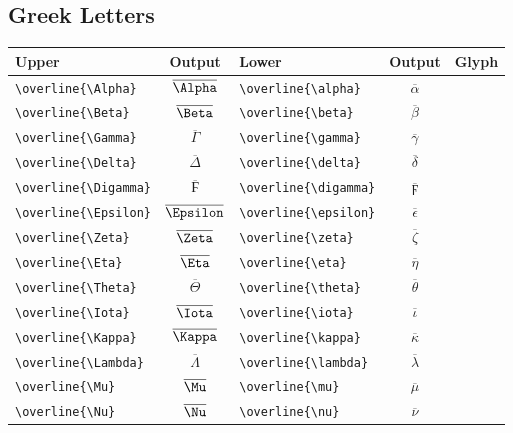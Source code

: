 \documentclass[12pt,a4paper]{article}
\begin{document}
\subsection*{Greek Letters}
\begin{longtable}{|l|c|l|c|c|}
\hline
\textbf{Upper} & \textbf{Output} & \textbf{Lower}        & \textbf{Output}               & \textbf{Glyph} \\
\hline
\verb|\overline{\Alpha}|         & $\overline{\Alpha}$   & \verb|\overline{\alpha}|      & $\overline{\alpha}$      & \\
\verb|\overline{\Beta}|          & $\overline{\Beta}$    & \verb|\overline{\beta}|       & $\overline{\beta}$       & \\
\verb|\overline{\Gamma}|         & $\overline{\Gamma}$   & \verb|\overline{\gamma}|      & $\overline{\gamma}$      & \\
\verb|\overline{\Delta}|         & $\overline{\Delta}$   & \verb|\overline{\delta}|      & $\overline{\delta}$      & \\
\verb|\overline{\Digamma}|       & $\overline{\Digamma}$ & \verb|\overline{\digamma}|    & $\overline{\digamma}$    & \\
\verb|\overline{\Epsilon}|       & $\overline{\Epsilon}$ & \verb|\overline{\epsilon}|    & $\overline{\epsilon}$    & \\
\verb|\overline{\Zeta}|          & $\overline{\Zeta}$    & \verb|\overline{\zeta}|       & $\overline{\zeta}$       & \\
\verb|\overline{\Eta}|           & $\overline{\Eta}$     & \verb|\overline{\eta}|        & $\overline{\eta}$        & \\
\verb|\overline{\Theta}|         & $\overline{\Theta}$   & \verb|\overline{\theta}|      & $\overline{\theta}$      & \\
\verb|\overline{\Iota}|          & $\overline{\Iota}$    & \verb|\overline{\iota}|       & $\overline{\iota}$       & \\
\verb|\overline{\Kappa}|         & $\overline{\Kappa}$   & \verb|\overline{\kappa}|      & $\overline{\kappa}$      & \\
\verb|\overline{\Lambda}|        & $\overline{\Lambda}$  & \verb|\overline{\lambda}|     & $\overline{\lambda}$     & \\
\verb|\overline{\Mu}|            & $\overline{\Mu}$      & \verb|\overline{\mu}|         & $\overline{\mu}$         & \\
\verb|\overline{\Nu}|            & $\overline{\Nu}$      & \verb|\overline{\nu}|         & $\overline{\nu}$         & \\

\end{longtable}
\end{document}
